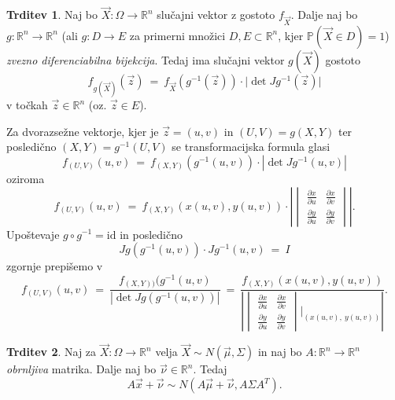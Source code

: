 \documentclass[11pt]{article}
\newcommand{\p}{\mathbb{P}}
\newcommand{\R}{\mathbb{R}}
\newcommand{\1}{\mathbbm{1}}
\theoremstyle{definition}
\theoremstyle{definition}
\newtheorem{trditev}{Trditev}[section]
\theoremstyle{definition}
\begin{document}
\begin{trditev}

Naj bo $\vec{X}: \Omega \rightarrow \R^n$ slučajni vektor z gostoto $f_{\vec{X}}$. Dalje naj bo $g: \R^n \rightarrow \R^n$ (ali $g: D \rightarrow E$ za primerni množici $D, E \subset \R^n$, kjer $\p(\vec{X} \in D) = 1$) \textit{zvezno diferenciabilna bijekcija}. Tedaj ima slučajni vektor $g(\vec{X})$ gostoto
$$f_{g(\vec{X})}(\vec{z}) ~=~ f_{\vec{X}} (g^{-1}(\vec{z})) \cdot |\det{Jg^{-1}(\vec{z})|}$$
v točkah $\vec{z} \in \R^n$ (oz. $\vec{z} \in E$).

Za dvorazsežne vektorje, kjer je $\vec{z} = (u, v)$ in $(U, V) = g(X, Y)$ ter posledično $(X, Y) = g^{-1}(U, V)$ se transformacijska formula glasi
$$f_{(U, V)}(u, v) ~=~ f_{(X ,Y)}(g^{-1}(u, v)) \cdot |\det{Jg^{-1}(u, v)}|$$
oziroma
$$f_{(U, V)}(u, v) ~=~ f_{(X, Y)}(x(u, v), y(u, v)) \cdot \left| \begin{vmatrix}
\frac{\partial x}{\partial u} & \frac{\partial x}{\partial v} \\
\frac{\partial y}{\partial u} & \frac{\partial y}{\partial v}
\end{vmatrix} \right|.$$
Upoštevaje $g \circ g^{-1} = \text{id}$ in posledično
$$Jg(g^{-1}(u, v)) \cdot Jg^{-1}(u, v) ~=~ I$$
zgornje prepišemo v
$$f_{(U, V)}(u, v) ~=~ \frac{f_{(X, Y))}(g^{-1}(u, v)}{|\det{Jg(g^{-1}(u, v))}|} ~=~ \frac{f_{(X, Y)}(x(u, v), y(u, v))}{\left| \begin{vmatrix}
\frac{\partial x}{\partial u} & \frac{\partial x}{\partial v} \\
\frac{\partial y}{\partial u} & \frac{\partial y}{\partial v}
\end{vmatrix} \Big|_{(x(u, v),~y(u, v))} \right|}.$$ 

\end{trditev}
\vspace{0.5cm}

\begin{trditev}

Naj za $\vec{X}: \Omega \rightarrow \R^n$ velja $\vec{X} \sim N(\vec{\mu}, \Sigma)$ in naj bo $A: \R^n \rightarrow \R^n$ \textit{obrnljiva} matrika. Dalje naj bo $\vec{\nu} \in \R^n$. Tedaj
$$A \vec{x} + \vec{\nu} \sim N(A \vec{\mu} + \vec{\nu}, A \Sigma A^T).$$

\end{trditev}
\vspace{0.5cm}

\end{document}
